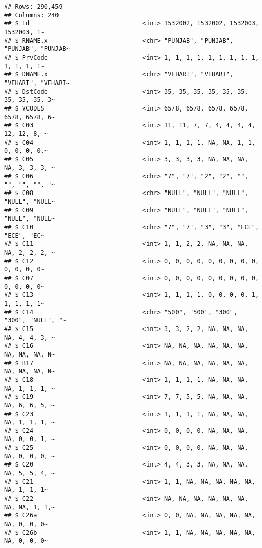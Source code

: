 \documentclass[
]{article}
\begin{document}
\begin{verbatim}
## Rows: 290,459
## Columns: 240
## $ Id                               <int> 1532002, 1532002, 1532003, 1532003, 1~
## $ RNAME.x                          <chr> "PUNJAB", "PUNJAB", "PUNJAB", "PUNJAB~
## $ PrvCode                          <int> 1, 1, 1, 1, 1, 1, 1, 1, 1, 1, 1, 1, 1~
## $ DNAME.x                          <chr> "VEHARI", "VEHARI", "VEHARI", "VEHARI~
## $ DstCode                          <int> 35, 35, 35, 35, 35, 35, 35, 35, 35, 3~
## $ VCODES                           <int> 6578, 6578, 6578, 6578, 6578, 6578, 6~
## $ C03                              <int> 11, 11, 7, 7, 4, 4, 4, 4, 12, 12, 8, ~
## $ C04                              <int> 1, 1, 1, 1, NA, NA, 1, 1, 0, 0, 0, 0,~
## $ C05                              <int> 3, 3, 3, 3, NA, NA, NA, NA, 3, 3, 3, ~
## $ C06                              <chr> "7", "7", "2", "2", "", "", "", "", "~
## $ C08                              <chr> "NULL", "NULL", "NULL", "NULL", "NULL~
## $ C09                              <chr> "NULL", "NULL", "NULL", "NULL", "NULL~
## $ C10                              <chr> "7", "7", "3", "3", "ECE", "ECE", "EC~
## $ C11                              <int> 1, 1, 2, 2, NA, NA, NA, NA, 2, 2, 2, ~
## $ C12                              <int> 0, 0, 0, 0, 0, 0, 0, 0, 0, 0, 0, 0, 0~
## $ C07                              <int> 0, 0, 0, 0, 0, 0, 0, 0, 0, 0, 0, 0, 0~
## $ C13                              <int> 1, 1, 1, 1, 0, 0, 0, 0, 1, 1, 1, 1, 1~
## $ C14                              <chr> "500", "500", "300", "300", "NULL", "~
## $ C15                              <int> 3, 3, 2, 2, NA, NA, NA, NA, 4, 4, 3, ~
## $ C16                              <int> NA, NA, NA, NA, NA, NA, NA, NA, NA, N~
## $ B17                              <int> NA, NA, NA, NA, NA, NA, NA, NA, NA, N~
## $ C18                              <int> 1, 1, 1, 1, NA, NA, NA, NA, 1, 1, 1, ~
## $ C19                              <int> 7, 7, 5, 5, NA, NA, NA, NA, 6, 6, 5, ~
## $ C23                              <int> 1, 1, 1, 1, NA, NA, NA, NA, 1, 1, 1, ~
## $ C24                              <int> 0, 0, 0, 0, NA, NA, NA, NA, 0, 0, 1, ~
## $ C25                              <int> 0, 0, 0, 0, NA, NA, NA, NA, 0, 0, 0, ~
## $ C20                              <int> 4, 4, 3, 3, NA, NA, NA, NA, 5, 5, 4, ~
## $ C21                              <int> 1, 1, NA, NA, NA, NA, NA, NA, 1, 1, 1~
## $ C22                              <int> NA, NA, NA, NA, NA, NA, NA, NA, 1, 1,~
## $ C26a                             <int> 0, 0, NA, NA, NA, NA, NA, NA, 0, 0, 0~
## $ C26b                             <int> 1, 1, NA, NA, NA, NA, NA, NA, 0, 0, 0~

\end{verbatim}
\end{document}

